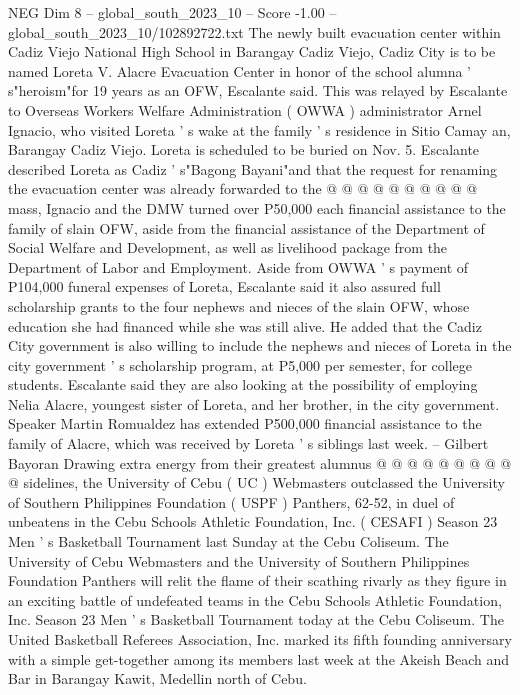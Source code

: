 \begin{textsample}{NEG Dim 8 – global\_south\_2023\_10 – Score -1.00 – global\_south\_2023\_10/102892722.txt}
The newly built evacuation center within Cadiz Viejo National High School in Barangay Cadiz Viejo, Cadiz City is to be named Loreta V.
Alacre Evacuation Center in honor of the school alumna ' s"heroism"for 19 years as an OFW, Escalante said.
This was relayed by Escalante to Overseas Workers Welfare Administration ( OWWA ) administrator Arnel Ignacio, who visited Loreta ' s wake at the family ' s residence in Sitio Camay an, Barangay Cadiz Viejo.
Loreta is scheduled to be buried on Nov. 5.
Escalante described Loreta as Cadiz ' s"Bagong Bayani"and that the request for renaming the evacuation center was already forwarded to the @ @ @ @ @ @ @ @ @ @ mass, Ignacio and the DMW turned over P50,000 each financial assistance to the family of slain OFW, aside from the financial assistance of the Department of Social Welfare and Development, as well as livelihood package from the Department of Labor and Employment.
Aside from OWWA ' s payment of P104,000 funeral expenses of Loreta, Escalante said it also assured full scholarship grants to the four nephews and nieces of the slain OFW, whose education she had financed while she was still alive.
He added that the Cadiz City government is also willing to include the nephews and nieces of Loreta in the city government ' s scholarship program, at P5,000 per semester, for college students.
Escalante said they are also looking at the possibility of employing Nelia Alacre, youngest sister of Loreta, and her brother, in the city government.
Speaker Martin Romualdez has extended P500,000 financial assistance to the family of Alacre, which was received by Loreta ' s siblings last week. -- Gilbert Bayoran Drawing extra energy from their greatest alumnus @ @ @ @ @ @ @ @ @ @ sidelines, the University of Cebu ( UC ) Webmasters outclassed the University of Southern Philippines Foundation ( USPF ) Panthers, 62-52, in duel of unbeatens in the Cebu Schools Athletic Foundation, Inc. ( CESAFI ) Season 23 Men ' s Basketball Tournament last Sunday at the Cebu Coliseum.
The University of Cebu Webmasters and the University of Southern Philippines Foundation Panthers will relit the flame of their scathing rivarly as they figure in an exciting battle of undefeated teams in the Cebu Schools Athletic Foundation, Inc.
Season 23 Men ' s Basketball Tournament today at the Cebu Coliseum.
The United Basketball Referees Association, Inc. marked its fifth founding anniversary with a simple get-together among its members last week at the Akeish Beach and Bar in Barangay Kawit, Medellin north of Cebu.

\end{textsample}
